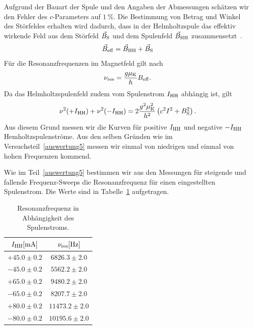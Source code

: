 \documentclass[paper=a4,
	fontsize=10pt,
	DIV=18,
	twocolumn,
	parskip=half
	]{scrartcl}
\numberwithin{equation}{section}    %
\begin{document}
Aufgrund der Bauart der Spule und den Angaben der Abmessungen schätzen wir den Fehler des $c$-Parameters auf $\SI{1}{\percent}$.
Die Bestimmung von Betrag und Winkel des Störfeldes erhalten wird dadurch, dass in der Helmholtzspule das effektiv wirkende Feld aus dem Störfeld $\vec{B}_{\rm S}$ und dem Spulenfeld $\vec{B}_{\rm HH}$ zusammensetzt~\citep{anleitung}.
\begin{equation}
	\vec{B}_{\rm eff} = \vec{B}_{\rm HH} + \vec{B}_{\rm S}
\end{equation}
Für die Resonanzfrequenzen im Magnetfeld gilt nach~\citet{anleitung}
\begin{equation}
	\nu_{\rm res} = \frac{g\mu_{\rm K}}{h}B_{\rm eff}.
\end{equation}
Da das Helmholtzspulenfeld zudem vom Spulenstrom $I_{\rm HH}$ abhängig ist, gilt~\citep{anleitung}
\begin{equation}
	\nu^2(+I_{\rm HH}) + \nu^2(-I_{\rm HH}) = 2\frac{g^2\mu_{\rm K}^2}{h^2}\left( c^2I^2 + B^2_{\rm S} \right).
	\label{eq.stoerfeld}
\end{equation}
Aus diesem Grund messen wir die Kurven für positive $I_{\rm HH}$ und negative $-I_{\rm HH}$ Hemholtzspulenströme. Aus den selben Gründen wie im Versuchsteil~\ref{auswertung5} messen wir einmal von niedrigen und einmal von hohen Frequenzen kommend.

Wie im Teil~\ref{auswertung5} bestimmen wir aus den Messungen für steigende und fallende Frequenz-Sweeps die Resonanzfrequenz für einen eingestellten Spulenstrom. Die Werte sind in Tabelle~\ref{tab.helmholtzfrequenz} aufgetragen.

\begin{table}[htp]
	\begin{center}	
	\begin{tabular}{cc}
		\hline
		$I_{\rm HH}[\mathrm{mA}]$ & $\nu_{\rm res}[\mathrm{Hz}]$\\
		\hline	
		$+ 45.0 \pm 0.2$   & $ 6826.3 \pm 2.0$\\
		$- 45.0 \pm 0.2$   & $ 5562.2 \pm 2.0$\\
		$+ 65.0 \pm 0.2$   & $ 9480.2 \pm 2.0$\\
		$- 65.0 \pm 0.2$   & $ 8207.7 \pm 2.0$\\
		$+ 80.0 \pm 0.2$   & $11473.2 \pm 2.0$\\
		$- 80.0 \pm 0.2$   & $10195.6 \pm 2.0$\\
		\hline
	\end{tabular}	
	\caption{Resonanzfrequenz in Abhängigkeit des Spulenstroms.}
	\label{tab.helmholtzfrequenz}
	\end{center}
\end{table}
\end{document}
